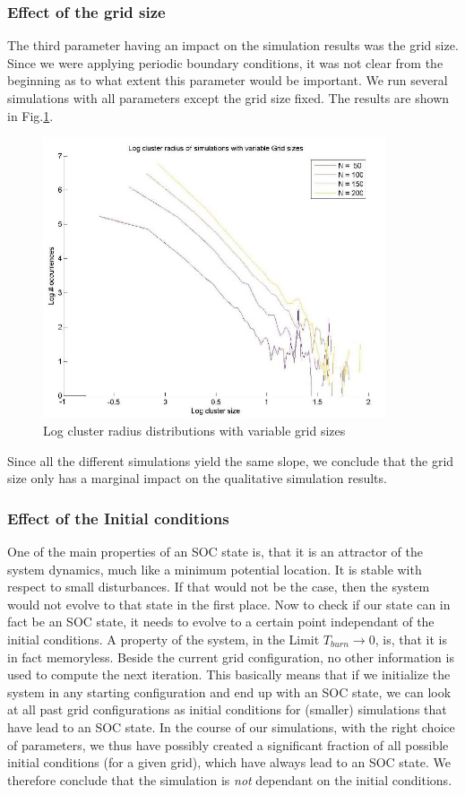 \documentclass[11pt]{article}
\begin{document}
\subsubsection{Effect of the grid size}
The third parameter having an impact on the simulation results was the grid size. Since we were applying periodic boundary conditions, it was not clear from the beginning as to what extent this parameter would be important. We run several simulations with all parameters except the grid size fixed. The results are shown in Fig.\ref{vargridsize}.
\begin{figure}[H]
\includegraphics[width=0.9\textwidth,keepaspectratio=true]{Pictures/vargridsize.jpg}
\caption{Log cluster radius distributions with variable grid sizes}
\label{vargridsize}
\end{figure}
Since all the different simulations yield the same slope, we conclude that the grid size only has a marginal impact on the qualitative simulation results.

\subsubsection{Effect of the Initial conditions}
One of the main properties of an SOC state is, that it is an attractor of the system dynamics, much like a minimum potential location. It is stable with respect to small disturbances. If that would not be the case, then the system would not evolve to that state in the first place. Now to check if our state can in fact be an SOC state, it needs to evolve to a certain point independant of the initial conditions. A property of the system, in the Limit $T_{burn} \rightarrow 0$, is, that it is in fact memoryless. Beside the current grid configuration, no other information is used to compute the next iteration. This basically means that if we initialize the system in any starting configuration and end up with an SOC state, we can look at all past grid configurations as initial conditions for (smaller) simulations that have lead to an SOC state. In the course of our simulations, with the right choice of parameters, we thus have possibly created a significant fraction of all possible initial conditions (for a given grid), which have always lead to an SOC state. We therefore conclude that the simulation is \emph{not} dependant on the initial conditions. 
\end{document}
